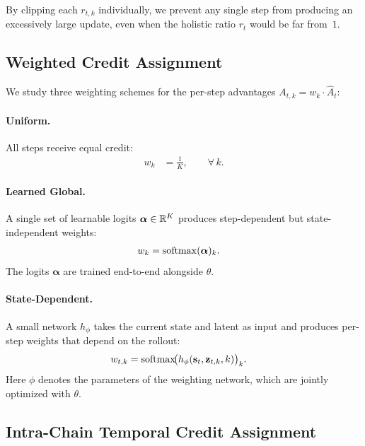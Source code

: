 By clipping each $r_{t,k}$ individually, we prevent any single step from
producing an excessively large update, even when the holistic ratio $r_t$
would be far from~$1$.

\subsection{Weighted Credit Assignment}
\label{sec:method:weights}

We study three weighting schemes for the per-step advantages
$A_{t,k} = w_k \cdot \hat{A}_t$:

\paragraph{Uniform.}
All steps receive equal credit:
\begin{align}
  w_k &= \frac{1}{K}, \qquad \forall\, k.
  \label{eq:uniform}
\end{align}

\paragraph{Learned Global.}
A single set of learnable logits $\boldsymbol{\alpha}\in\mathbb{R}^K$ produces
step-dependent but state-independent weights:
\begin{align}
  w_k &= \operatorname{softmax}(\boldsymbol{\alpha})_k.
  \label{eq:learned_global}
\end{align}
The logits $\boldsymbol{\alpha}$ are trained end-to-end alongside $\theta$.

\paragraph{State-Dependent.}
A small network $h_\phi$ takes the current state and latent as input and
produces per-step weights that depend on the rollout:
\begin{align}
  w_{t,k} &= \operatorname{softmax}\!\bigl(
                h_\phi(\mathbf{s}_t, \mathbf{z}_{t,k}, k)
              \bigr)_k.
  \label{eq:state_dep}
\end{align}
Here $\phi$ denotes the parameters of the weighting network, which are
jointly optimized with $\theta$.

\subsection{Intra-Chain Temporal Credit Assignment}
\label{sec:method:intra}

